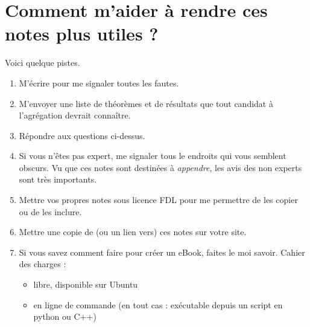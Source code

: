 \section{Comment m'aider à rendre ces notes plus utiles ?}

Voici quelque pistes.

\begin{enumerate}
    \item
        M'écrire pour me signaler toutes les fautes.
    \item
        M'envoyer une liste de théorèmes et de résultats que tout candidat à l'agrégation devrait connaître.
    \item
        Répondre aux questions ci-dessus.
    \item
        Si vous n'êtes pas expert, me signaler tous le endroits qui vous semblent obscurs. Vu que ces notes sont destinées à \emph{appendre}, les avis des non experts sont très importants.
    \item
        Mettre vos propres notes sous licence FDL pour me permettre de les copier ou de les inclure. 
    \item
        Mettre une copie de (ou un lien vers) ces notes sur votre site.
    \item
        Si vous savez comment faire  pour créer un eBook, faites le moi savoir. Cahier des charges :
        \begin{itemize}
            \item libre, disponible sur Ubuntu
            \item en ligne de commande (en tout cas : exécutable depuis un script en python ou C++)
        \end{itemize}
\end{enumerate}


